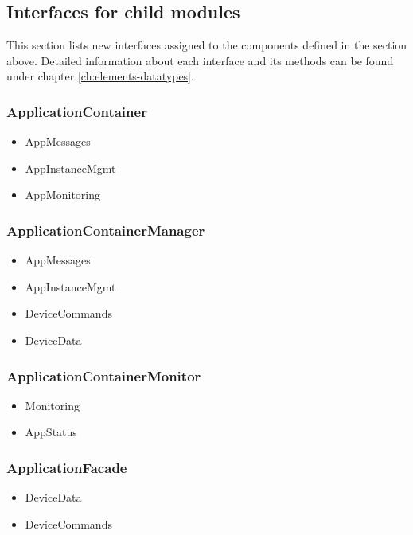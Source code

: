 \subsection{Interfaces for child modules}
    This section lists new interfaces assigned to the components defined
    in the section above. Detailed information about each interface and
    its methods can be found under chapter \ref{ch:elements-datatypes}. \\

    \subsubsection{ApplicationContainer}
        \begin{itemize}
            \item AppMessages
            \item AppInstanceMgmt
            \item AppMonitoring
        \end{itemize}

    \subsubsection{ApplicationContainerManager}
        \begin{itemize}
            \item AppMessages
            \item AppInstanceMgmt
            \item DeviceCommands
            \item DeviceData
        \end{itemize}

    \subsubsection{ApplicationContainerMonitor}
        \begin{itemize}
            \item Monitoring
            \item AppStatus
        \end{itemize}

    \subsubsection{ApplicationFacade}
        \begin{itemize}
            \item DeviceData
            \item DeviceCommands
        \end{itemize}

